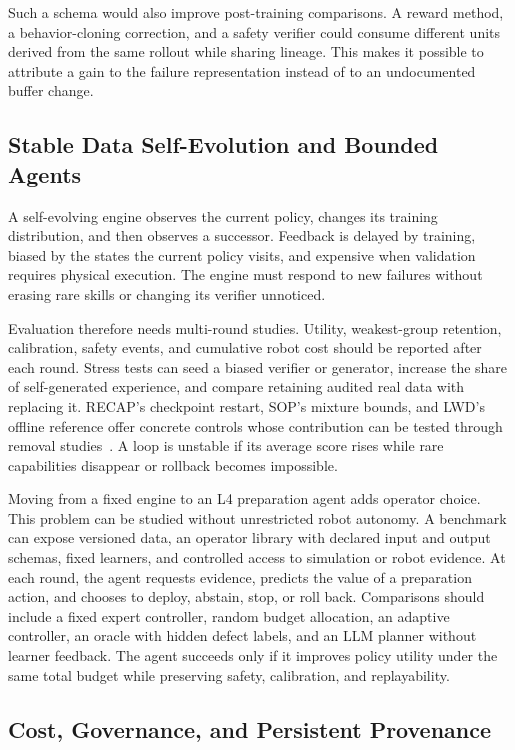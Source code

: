 Such a schema would also improve post-training comparisons. A reward method, a behavior-cloning correction, and a safety verifier could consume different units derived from the same rollout while sharing lineage. This makes it possible to attribute a gain to the failure representation instead of to an undocumented buffer change.

\subsection{Stable Data Self-Evolution and Bounded Agents}

A self-evolving engine observes the current policy, changes its training distribution, and then observes a successor. Feedback is delayed by training, biased by the states the current policy visits, and expensive when validation requires physical execution. The engine must respond to new failures without erasing rare skills or changing its verifier unnoticed.

Evaluation therefore needs multi-round studies. Utility, weakest-group retention, calibration, safety events, and cumulative robot cost should be reported after each round. Stress tests can seed a biased verifier or generator, increase the share of self-generated experience, and compare retaining audited real data with replacing it. RECAP's checkpoint restart, SOP's mixture bounds, and LWD's offline reference offer concrete controls whose contribution can be tested through removal studies~\cite{intelligence20250_2511_14759,pan2026sop_2601_03044,wang2026learning_2605_00416}. A loop is unstable if its average score rises while rare capabilities disappear or rollback becomes impossible.

Moving from a fixed engine to an L4 preparation agent adds operator choice. This problem can be studied without unrestricted robot autonomy. A benchmark can expose versioned data, an operator library with declared input and output schemas, fixed learners, and controlled access to simulation or robot evidence. At each round, the agent requests evidence, predicts the value of a preparation action, and chooses to deploy, abstain, stop, or roll back. Comparisons should include a fixed expert controller, random budget allocation, an adaptive controller, an oracle with hidden defect labels, and an LLM planner without learner feedback. The agent succeeds only if it improves policy utility under the same total budget while preserving safety, calibration, and replayability.

\subsection{Cost, Governance, and Persistent Provenance}

